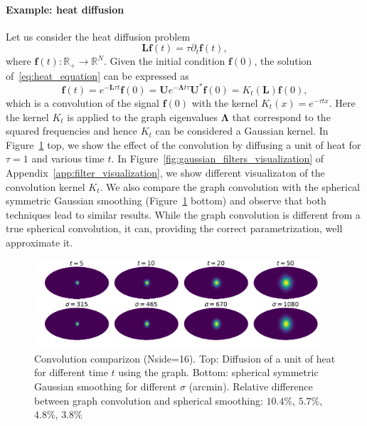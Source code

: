 \documentclass[final,twocolumn,3p,times,authoryear]{elsarticle}
\renewcommand{\b}[1]{{\bm{#1}}}   %
\newcommand{\1}{\b{1}}              %
\newcommand{\0}{\b{0}}              %
\newcommand{\g}[1]{\b{#1}}
\renewcommand{\L}{\b{L}} %
\newcommand{\U}{\b{U}}
\newcommand{\bLambda}{\b{\Lambda}}
\begin{document}
\paragraph{Example: heat diffusion}
Let us consider the heat diffusion problem 
\begin{equation} \label{eq:heat_equation}
\L \b{f}(t) = \tau \partial_t \b{f}(t),
\end{equation}
where $\b{f}(t): \mathbb{R}_+ \rightarrow \mathbb{R}^N$. Given the initial condition 
$\b{f}(0)$, the solution of~\ref{eq:heat_equation} can be expressed as
\begin{equation}
\b{f}(t) = e^{-\L \tau t} \b{f}(0) = \U e^{-\bLambda t \tau} \U^* \g{f}(0) = K_t(\L) \b{f}(0), 
\end{equation}
which is a convolution of the signal $\b{f}(0)$ with the kernel $K_t(x)=e^{-\tau
t x}$. Here the kernel $K_t$ is applied to the graph eigenvalues $\bLambda$ that
correspond to the squared frequencies and hence $K_t$ can be considered a
Gaussian kernel. In Figure~\ref{fig:gaussian_filters_comparizon} top, we show
the effect of the convolution by diffusing a unit of heat for $\tau=1$ and various 
time $t$. In  Figure~\ref{fig:gaussian_filters_visualization} of
Appendix~\ref{app:filter_visualization}, we show different visualizaton of the
convolution kernel $K_t$. We also compare the graph convolution with the
spherical symmetric Gaussian smoothing
(Figure~\ref{fig:gaussian_filters_comparizon} bottom) and observe that both
techniques lead to similar results. While the graph convolution is different
from a true spherical convolution, it can, providing the correct
parametrization, well approximate it.

\begin{figure}[!ht]
\centering
\includegraphics[width=0.95\textwidth]{figures/gaussian_filters_sphere.pdf}
\caption{Convolution comparizon (Nside=16). 
Top: Diffusion of a unit of heat for different time $t$ using the graph. 
Bottom: spherical symmetric Gaussian smoothing for different $\sigma$ (arcmin). 
Relative difference between graph convolution and spherical smoothing: $10.4$\%, $5.7$\%, $4.8$\%, $3.8$\% }
\label{fig:gaussian_filters_comparizon}
\end{figure}
\end{document}
